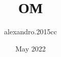 \documentclass[a4paper,14pt]{extarticle}
\title{ОМ}
\author{alexandro.2015cc }
\date{May 2022}
\begin{document}


\tableofcontents
\pagebreak









\end{document}
